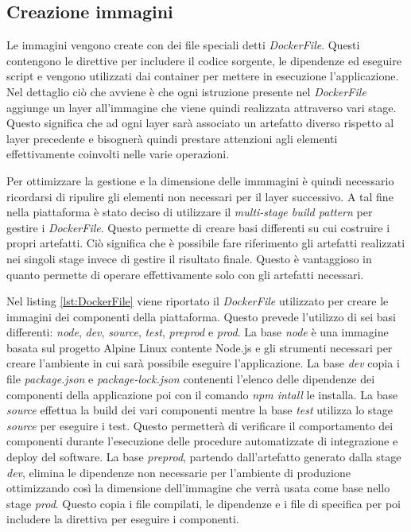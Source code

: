 \subsection{Creazione immagini}

Le immagini vengono create con dei file speciali detti \textit{DockerFile}.
Questi contengono le direttive per includere il codice sorgente, le dipendenze ed eseguire script e vengono utilizzati
dai container per mettere in esecuzione l'applicazione. Nel dettaglio ciò che avviene è che ogni istruzione
presente nel \textit{DockerFile} aggiunge un layer all'immagine che viene quindi realizzata attraverso vari stage.
Questo significa che ad ogni layer sarà associato un artefatto diverso rispetto al layer precedente e bisognerà
quindi prestare attenzioni agli elementi effettivamente coinvolti nelle varie operazioni.

Per ottimizzare la gestione e la dimensione delle immmagini è quindi necessario ricordarsi di ripulire gli
elementi non necessari per il layer successivo. A tal fine nella piattaforma è stato deciso di
utilizzare il \textit{multi-stage build pattern} per gestire i \textit{DockerFile}. Questo permette di creare basi
differenti su cui costruire i propri artefatti. Ciò significa che è possibile
fare riferimento gli artefatti realizzati nei singoli stage invece di gestire il risultato finale.
Questo è vantaggioso in quanto permette di operare effettivamente solo con gli artefatti necessari.

Nel listing \ref{lst:DockerFile} viene riportato il \textit{DockerFile} utilizzato per creare le immagini dei componenti della piattaforma.
Questo prevede l'utilizzo di sei basi differenti: \textit{node}, \textit{dev}, \textit{source}, \textit{test}, \textit{preprod} e \textit{prod}.
La base \textit{node} è una immagine basata sul progetto Alpine Linux contente Node.js e gli strumenti necessari per
creare l'ambiente in cui sarà possibile eseguire l'applicazione. La base \textit{dev} copia i file \textit{package.json} e \textit{package-lock.json}
contenenti l'elenco delle dipendenze dei componenti della applicazione poi con il comando \textit{npm intall} le installa.
La base \textit{source} effettua la build dei vari componenti mentre la base \textit{test} utilizza lo stage \textit{source} per eseguire i test.
Questo permetterà di verificare il comportamento dei componenti durante l'esecuzione delle procedure automatizzate di integrazione
e deploy del software. La base \textit{preprod}, partendo dall'artefatto generato dalla stage \textit{dev}, elimina le dipendenze non necessarie per l'ambiente
di produzione ottimizzando così la dimensione dell'immagine che verrà usata come base nello stage \textit{prod}.
Questo copia i file compilati, le dipendenze e i file di specifica per poi includere la direttiva per eseguire i componenti.

